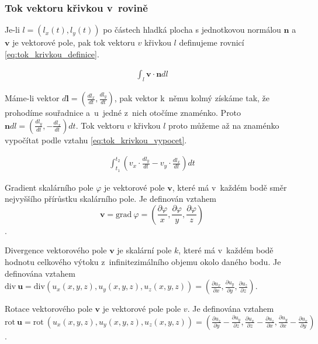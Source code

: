 \documentclass{book}
\newcommand{\vect}[1]{\boldsymbol{#1}}
\newcommand{\grad}{\mathrm{grad}}
\newcommand{\diverg}{\mathrm{div}}
\newcommand{\rot}{\mathrm{rot}}
\begin{document}
\subsubsection{Tok vektoru křivkou v~rovině}


Je-li \(l = \left(l_x(t), l_y(t)\right)\) po částech hladká plocha s jednotkovou normálou \(\vect{n}\) a \(\vect{v}\) je vektorové pole,
pak tok vektoru \(v\) křivkou \(l\) definujeme rovnicí \eqref{eq:tok_krivkou_definice}.

\begin{equation}
\label{eq:tok_krivkou_definice}
\begin{split}
\int_l \vect{v} \cdot \vect{n} dl
\end{split}
\end{equation}

Máme-li vektor \(d \vect{l} = \left(\frac{d l_x}{dt}, \frac{d l_y}{dt}\right)\), pak vektor k~němu kolmý získáme tak, že prohodíme souřadnice a~u~jedné z~nich otočíme znaménko. Proto \(\vect{n} dl = \left(\frac{d l_y}{dt}, -\frac{d l_x}{dt}\right) dt\). Tok vektoru \(v\) křivkou \(l\) proto můžeme až na znaménko vypočítat podle vztahu \eqref{eq:tok_krivkou_vypocet}.

\begin{equation}
\label{eq:tok_krivkou_vypocet}
\begin{split}
\int_{t_1}^{t_2} \left (v_x \cdot \frac{d l_y}{dt} -v_y \cdot \frac{d l_x}{dt} \right) dt
\end{split}
\end{equation}


Gradient skalárního pole \(\varphi\) je vektorové pole \(\vect{v}\), které má v~každém bodě směr nejvyššího přírůstku skalárního pole. Je definován vztahem
\[
\vect{v} = \grad \ \varphi = \left(\frac{\partial \varphi}{x}, \frac{\partial \varphi}{y}, \frac{\partial \varphi}{z}\right)
\].

Divergence vektorového pole \(\vect{v}\) je skalární pole \(k\), které má v~každém bodě hodnotu celkového výtoku z~infinitezimálního objemu okolo daného bodu. Je definována vztahem \(\diverg \ \vect{u} = \diverg (u_x(x, y, z), u_y(x, y, z), u_z(x, y, z)) = \left(\frac{\partial u_x}{\partial x}, \frac{\partial u_y}{\partial y}, \frac{\partial u_z}{\partial z}\right)\).

Rotace vektorového pole \(\vect{v}\) je vektorové pole pole \(v\). Je definována vztahem \(\rot \ \vect{u} = \rot \ (u_x(x, y, z), u_y(x, y, z), u_z(x, y, z)) = \left(\frac{\partial u_z}{\partial y} - \frac{\partial u_y}{\partial z}, \frac{\partial u_x}{\partial z} - \frac{\partial u_z}{\partial x}, \frac{\partial u_y}{\partial x} - \frac{\partial u_x}{\partial y}\right)\).
\end{document}
